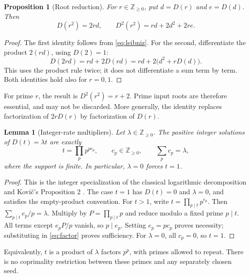 \documentclass[11pt]{article}
\newtheorem{proposition}[theorem]{Proposition}
\newtheorem{lemma}[theorem]{Lemma}
\theoremstyle{definition}
\theoremstyle{remark}
\newcommand{\NN}{\mathbb Z_{\geq0}}
\newcommand{\DD}{D^{2}}
\begin{document}
\begin{proposition}[Root reduction]\label{prop:root}
For $r\in\NN$, put $d=D(r)$ and $e=D(d)$. Then
\begin{equation}\label{eq:root}
 D(r^{2})=2rd,\qquad \DD(r^{2})=rd+2d^{2}+2re.
\end{equation}
\end{proposition}
\begin{proof}
The first identity follows from \eqref{eq:leibniz}. For the second,
differentiate the product $2(rd)$, using $D(2)=1$:
\[
 D(2rd)=rd+2D(rd)=rd+2\bigl(d^{2}+rD(d)\bigr).
\]
This uses the product rule twice; it does not differentiate a sum
term by term. Both identities hold also for $r=0,1$.
\end{proof}

For prime $r$, the result is $\DD(r^{2})=r+2$. Prime input roots are
therefore essential, and may not be discarded. More generally, the
identity replaces factorization of $2rD(r)$ by factorization of $D(r)$.

\begin{lemma}[Integer-rate multipliers]\label{lem:rate}
Let $\lambda\in\NN$. The positive integer solutions of $D(t)=\lambda t$
are exactly
\begin{equation}\label{eq:mult}
 t=\prod_p p^{p c_p},\qquad c_p\in\NN,\qquad \sum_p c_p=\lambda,
\end{equation}
where the support is finite. In particular, $\lambda=0$ forces $t=1$.
\end{lemma}
\begin{proof}
This is the integer specialization of the classical logarithmic
decomposition \cite{ufn} and Kovi\v{c}'s Proposition 2 \cite{kovic}.
The case $t=1$ has $D(t)=0$ and $\lambda=0$, and satisfies the
empty-product convention. For $t>1$, write $t=\prod_{p\mid t}p^{e_p}$. Then
$\sum_{p\mid t}e_p/p=\lambda$. Multiply by $P=\prod_{p\mid t}p$ and reduce
modulo a fixed prime $p\mid t$. All terms except $e_pP/p$ vanish, so
$p\mid e_p$. Setting $e_p=pc_p$ proves necessity; substituting in
\eqref{eq:factor} proves sufficiency. For $\lambda=0$, all $c_p=0$, so $t=1$.
\end{proof}

Equivalently, $t$ is a product of $\lambda$ factors $p^{p}$, with primes
allowed to repeat. There is no coprimality restriction between these
primes and any separately chosen seed.
\end{document}
